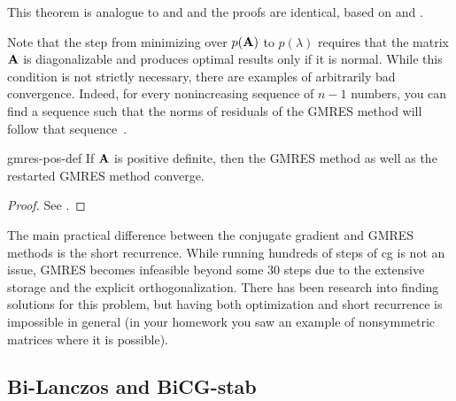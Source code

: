 \begin{remark}
  This theorem is analogue to  and
   and the proofs are
  identical, based on  and
  .

  Note that the step from minimizing over $p(\mathbf A)$ to $p(\lambda)$
  requires that the matrix $\mathbf A$ is diagonalizable and produces
  optimal results only if it is normal. While this condition is not
  strictly necessary, there are examples of arbitrarily bad
  convergence. Indeed, for every nonincreasing sequence of $n-1$
  numbers, you can find a sequence such that the norms of residuals of
  the GMRES method will follow that
  sequence~\cite{GreenbaumPtakStrakos96}.
\end{remark}

\begin{Theorem}{gmres-pos-def}
  If $\mathbf A$ is positive definite, then the GMRES method as well as
  the restarted GMRES method converge.
\end{Theorem}

\begin{proof}
  See \cite[Theorem 6.30]{Saad00}.
\end{proof}

\begin{remark}
  The main practical difference between the conjugate gradient and
  GMRES methods is the short recurrence. While running hundreds of
  steps of cg is not an issue, GMRES becomes infeasible beyond some 30
  steps due to the extensive storage and the explicit
  orthogonalization. There has been research into finding solutions
  for this problem, but having both optimization and short recurrence
  is impossible in general (in your homework you saw an example of
  nonsymmetric matrices where it is possible).
\end{remark}



\subsection{Bi-Lanczos and BiCG-stab}

